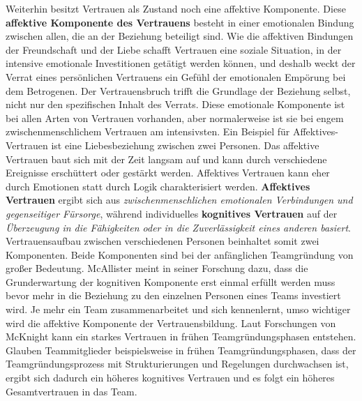 \documentclass[a4paper,11pt]{article}%
\renewcommand{\\}{\vspace*{0.5\baselineskip} \newline}
\begin{document}
Weiterhin besitzt Vertrauen als \dq{}Zustand\dq{} noch eine affektive Komponente.\\ \dq Diese \textbf{affektive Komponente des Vertrauens} besteht in einer emotionalen Bindung zwischen allen, die an der Beziehung beteiligt sind. Wie die affektiven Bindungen der Freundschaft und der Liebe schafft Vertrauen eine soziale Situation, in der intensive emotionale Investitionen getätigt werden können, und deshalb weckt der Verrat eines persönlichen Vertrauens ein Gefühl der emotionalen Empörung bei dem Betrogenen. Der Vertrauensbruch trifft die Grundlage der Beziehung selbst, nicht nur den spezifischen Inhalt des Verrats. Diese emotionale Komponente ist bei allen Arten von Vertrauen vorhanden, aber normalerweise ist sie bei engem zwischenmenschlichem Vertrauen am intensivsten.\dq{} \citep[p.971]{lewis1985trust} 
\\
Ein Beispiel für Affektives-Vertrauen ist eine Liebesbeziehung zwischen zwei Personen. Das affektive Vertrauen baut sich mit der Zeit langsam auf und kann durch verschiedene Ereignisse erschüttert oder gestärkt werden. Affektives Vertrauen kann eher durch Emotionen statt durch Logik charakterisiert werden.
\textbf{Affektives Vertrauen} ergibt sich aus \textit{zwischenmenschlichen emotionalen Verbindungen und gegenseitiger Fürsorge}, während individuelles \textbf{kognitives Vertrauen} auf der \textit{Überzeugung in die Fähigkeiten oder in die Zuverlässigkeit eines anderen basiert}. 
\\
Vertrauensaufbau zwischen verschiedenen Personen beinhaltet somit zwei Komponenten. Beide Komponenten sind bei der anfänglichen Teamgründung von großer Bedeutung. 
McAllister meint in seiner Forschung dazu, dass die Grunderwartung der kognitiven Komponente erst einmal erfüllt werden muss bevor mehr in die Beziehung zu den einzelnen Personen eines Teams investiert wird. Je mehr ein Team zusammenarbeitet und sich kennenlernt, umso wichtiger wird die affektive Komponente der Vertrauensbildung. \citep[p.30]{mcallister1995affect}\\
Laut Forschungen von McKnight kann ein starkes Vertrauen in frühen Teamgründungsphasen entstehen. Glauben Teammitglieder beispielsweise in frühen Teamgründungsphasen, dass der Teamgründungsprozess mit Strukturierungen und Regelungen durchwachsen ist, ergibt sich dadurch ein höheres kognitives Vertrauen und es folgt ein höheres Gesamtvertrauen in das Team. \citep[p.478-479]{mcknight1998initial} 
\end{document}

